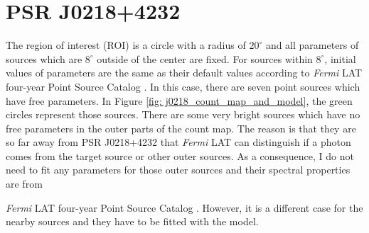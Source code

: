 \documentclass[a4paper, 12pt]{report}
\newcommand{\fgl}[0]{
  \textit{Fermi} LAT four-year Point Source Catalog
}
\begin{document}
      \begin{table}[!ht]
        \centering
        \caption[Fit results with data from year 2009 to year 2018.]
          {Fit results with data from year 2009 to year 2018. The physical 
          meanings of $\Gamma$ and $E_c$ are the same as Table 
          \ref{table: previous_result_comparison}}
        \label{table: 2018_fit_data}
      \end{table}

  \section{PSR J0218+4232}
    The region of interest (ROI) is a circle with a radius of $20^\circ$ and all parameters of
    sources which are $8^\circ$ outside of the center are fixed. For sources within 
    $8^\circ$, initial values of parameters are the same as their default values according 
    to \fgl. In this case, there are seven point sources which have free parameters. In 
    Figure \ref{fig: j0218_count_map_and_model}, the green circles represent those sources.
    There are some very bright sources which have no free parameters
    in the outer parts of the count map. The reason is that they are so far away 
    from PSR J0218+4232 that \textit{Fermi} LAT can distinguish if a photon comes 
    from the target source or other outer sources. As a consequence, I do not need to fit 
    any parameters for those outer sources and their spectral properties are from 
    \fgl{}. However, it is a different case for the nearby sources and they have to be fitted
    with the model.
          
\end{document}
